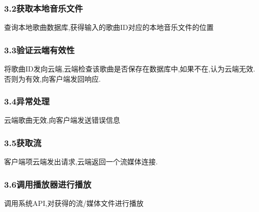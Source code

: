 \subsubsection{3.2获取本地音乐文件}

查询本地歌曲数据库,获得输入的歌曲ID对应的本地音乐文件的位置

\subsubsection{3.3验证云端有效性}

将歌曲ID发向云端,云端检查该歌曲是否保存在数据库中,如果不在,认为云端无效.否则为有效,向客户端发回响应.

\subsubsection{3.4异常处理}

云端歌曲无效,向客户端发送错误信息

\subsubsection{3.5获取流}

客户端项云端发出请求,云端返回一个流媒体连接.

\subsubsection{3.6调用播放器进行播放}

调用系统API,对获得的流/媒体文件进行播放


